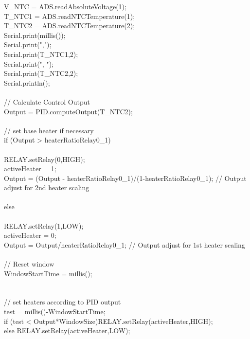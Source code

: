 \begin{appendices}
{{{        V\_NTC = ADS.readAbsoluteVoltage(1); \\
        T\_NTC1 = ADS.readNTCTemperature(1); \\
        T\_NTC2 = ADS.readNTCTemperature(2); \\
        Serial.print(millis()); \\
        Serial.print(","); \\
        Serial.print(T\_NTC1,2); \\
        Serial.print(", "); \\
        Serial.print(T\_NTC2,2); \\   
        Serial.println(); \\
\\
        // Calculate Control Output \\
        Output = PID.computeOutput(T\_NTC2); \\
\\
        // set base heater if necessary \\
        if (Output > heaterRatioRelay0\_1) \\
        { \\
            RELAY.setRelay(0,HIGH); \\
            activeHeater = 1; \\
            Output = (Output - heaterRatioRelay0\_1)/(1-heaterRatioRelay0\_1);		// Output adjust for 2nd heater scaling \\
        } \\
        else \\
        { \\
            RELAY.setRelay(1,LOW); \\
            activeHeater = 0; \\
            Output = Output/heaterRatioRelay0\_1;		// Output adjust for 1st heater scaling \\
        } \\
        // Reset window \\
        WindowStartTime = millis(); \\   
    } \\
\\
    // set heaters according to PID output \\
    test = millis()-WindowStartTime; \\
    if (test < Output*WindowSize){RELAY.setRelay(activeHeater,HIGH);} \\
    else {RELAY.setRelay(activeHeater,LOW);} \\
}}
\end{appendices}
